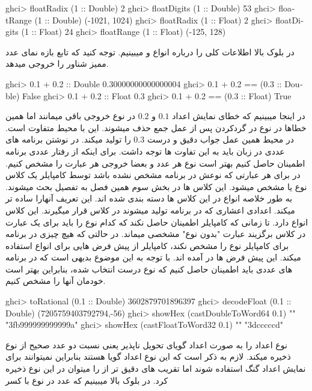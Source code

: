 \begin{latin}
\begin{ghcode}
ghci> floatRadix (1 :: Double)
2
ghci> floatDigits (1 :: Double)
53
ghci> floatRange (1 :: Double)
(-1021, 1024)
ghci> floatRadix (1 :: Float)
2
ghci> floatDigits (1 :: Float)
24
ghci> floatRange (1 :: Float)
(-125, 128)



\end{ghcode}
\end{latin}
در بلوک بالا اطلاعات کلی را درباره انواع 
و 
میبینیم. توجه کنید که تابع 
بازه نمای عدد ممیز شناور را خروجی میدهد. 
\begin{latin}
\begin{ghcode}
ghci> 0.1 + 0.2 :: Double
0.30000000000000004
ghci> 0.1 + 0.2 == (0.3 :: Double)
False
ghci> 0.1 + 0.2 :: Float
0.3
ghci> 0.1 + 0.2 == (0.3 :: Float)
True
\end{ghcode}
\end{latin}
در اینجا میبینیم که خطای نمایش اعداد
$0.1$
و 
$0.2$
در نوع 
خروجی باقی میمانند اما همین خطاها در نوع
در گردکردن پس از عمل جمع حذف میشوند. این با محیط 
 متفاوت است. در محیط 
همین عمل جواب دقیق و درست 
$0.3$
را تولید میکند. در نوشتن برنامه های عددی در زبان 
باید به این تفاوت ها توجه داشت. برای اینکه از رفتار عددی برنامه اطمینان حاصل کنیم بهتر است نوع هر عدد و بعضا خروجی هر عبارت را مشخص کنیم. در 
برای هر عبارتی که نوعش در برنامه مشخص نشده باشد توسط کامپایلر یک کلاس نوع یا 
مشخص میشود. این کلاس ها در بخش سوم همین فصل به تفصیل بحث میشوند. به طور خلاصه انواع در این کلاس ها دسته بندی شده اند. این تعریف آنهارا ساده تر میکند. اعدادی اعشاری که در برنامه تولید میشوند در کلاس 
قرار میگیرند. این کلاس انواع 
دارد. تا زمانی که کامپایلر اطمینان حاصل نکند که کدام نوع را باید برای یک عبارت در کلاس 
 برگزیند عبارت "بدون نوع" مشخصی میماند. در حالتی که هیچ چیزی در برنامه برای کامپایلر نوع را مشخص نکند، کامپایلر از پیش فرض هایی برای انواع استفاده میکند. این پیش فرض ها در 
آمده اند. با توجه به این موضوع بدیهی است که در برنامه های عددی باید اطمینان حاصل کنیم که نوع درست انتخاب شده، بنابراین بهتر است خودمان آنها را مشخص کنیم.
\newline
\begin{latin}
\begin{ghcode}
ghci> toRational (0.1 :: Double)               
3602879701896397 %
ghci> decodeFloat (0.1 :: Double)              
(7205759403792794,-56)
ghci> showHex (castDoubleToWord64 0.1) ""      
"3fb999999999999a"
ghci> showHex (castFloatToWord32 0.1) ""       
"3dcccccd"
\end{ghcode}
\end{latin}
نوع 
اعداد را به صورت اعداد گویای تحویل ناپذیر یعنی نسبت دو عدد صحیح از نوع 
ذخیره میکند. لازم به ذکر است که این نوع اعداد گویا هستند بنابراین نمیتوانند برای نمایش اعداد گنگ استفاده شوند اما تقریب های دقیق تر از 
را میتوان در این نوع ذخیره کرد. در بلوک بالا میبینیم که عدد 
در نوع 
با کسر


